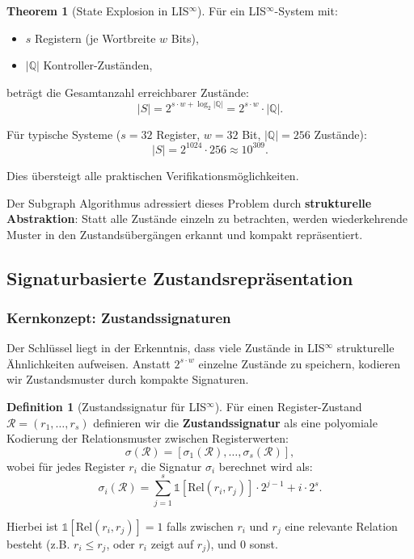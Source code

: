 \documentclass[a4paper,12pt]{article}
\theoremstyle{definition}
\newtheorem{theorem}{Theorem}
\newtheorem{definition}{Definition}
\begin{document}
\begin{theorem}[State Explosion in LIS$^{\infty}$]
	Für ein LIS$^{\infty}$-System mit:
	\begin{itemize}
		\item $s$ Registern (je Wortbreite $w$ Bits),
		\item $|\mathbb{Q}|$ Kontroller-Zuständen,
	\end{itemize}
	beträgt die Gesamtanzahl erreichbarer Zustände:
	\[
	|S| = 2^{s \cdot w + \log_2|\mathbb{Q}|} = 2^{s \cdot w} \cdot |\mathbb{Q}|.
	\]
	
	Für typische Systeme ($s = 32$ Register, $w = 32$ Bit, $|\mathbb{Q}| = 256$ Zustände):
	\[
	|S| = 2^{1024} \cdot 256 \approx 10^{309}.
	\]
	
	Dies übersteigt alle praktischen Verifikationsmöglichkeiten.
\end{theorem}

Der Subgraph Algorithmus adressiert dieses Problem durch \textbf{strukturelle Abstraktion}: Statt alle Zustände einzeln zu betrachten, werden wiederkehrende Muster in den Zustandsübergängen erkannt und kompakt repräsentiert.

\subsection{Signaturbasierte Zustandsrepräsentation}

\subsubsection{Kernkonzept: Zustandssignaturen}

Der Schlüssel liegt in der Erkenntnis, dass viele Zustände in LIS$^{\infty}$ strukturelle Ähnlichkeiten aufweisen. Anstatt $2^{s \cdot w}$ einzelne Zustände zu speichern, kodieren wir Zustandsmuster durch kompakte Signaturen.

\begin{definition}[Zustandssignatur für LIS$^{\infty}$]
	\label{def:lis_signature}
	Für einen Register-Zustand $\mathcal{R} = (r_1, \ldots, r_s)$ definieren wir die \textbf{Zustandssignatur} als eine polyomiale Kodierung der Relationsmuster zwischen Registerwerten:
	\[
	\sigma(\mathcal{R}) = \left[\sigma_1(\mathcal{R}), \ldots, \sigma_s(\mathcal{R})\right],
	\]
	wobei für jedes Register $r_i$ die Signatur $\sigma_i$ berechnet wird als:
	\[
	\sigma_i(\mathcal{R}) = \sum_{j=1}^{s} \mathbb{1}[\text{Rel}(r_i, r_j)] \cdot 2^{j-1} + i \cdot 2^s.
	\]
	
	Hierbei ist $\mathbb{1}[\text{Rel}(r_i, r_j)] = 1$ falls zwischen $r_i$ und $r_j$ eine relevante Relation besteht (z.B. $r_i \leq r_j$, oder $r_i$ zeigt auf $r_j$), und $0$ sonst.
\end{definition}
\end{document}
